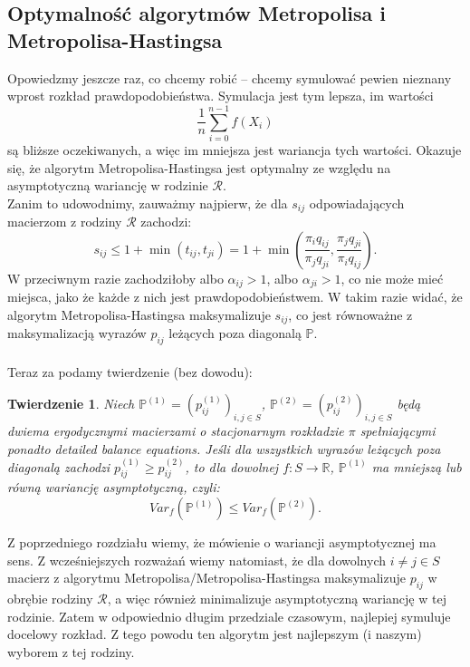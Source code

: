 \documentclass[a4paper]{article}
\theoremstyle{defn}
\theoremstyle{theorem}
\newtheorem{theorem}[defn]{Twierdzenie}
\theoremstyle{lemma}
\theoremstyle{cor}
\theoremstyle{fact}
\begin{document}
\subsection{Optymalność algorytmów Metropolisa i Metropolisa-Hastingsa}
Opowiedzmy jeszcze raz, co chcemy robić – chcemy symulować pewien nieznany wprost rozkład prawdopodobieństwa. Symulacja jest tym lepsza, im wartości $$\frac{1}{n}\sum\limits_{i = 0}^{n-1} f(X_i)$$
są bliższe oczekiwanych, a więc im mniejsza jest wariancja tych wartości. Okazuje się, że algorytm Metropolisa-Hastingsa jest optymalny ze względu na asymptotyczną wariancję w rodzinie $\mathcal{R}$.\\

Zanim to udowodnimy, zauważmy najpierw, że dla $s_{ij}$ odpowiadających macierzom z rodziny $\mathcal{R}$ zachodzi:
$$s_{ij} \leq 1 + \min(t_{ij}, t_{ji}) = 1 + \min\left(\frac{\pi_i q_{ij}}{\pi_j q_{ji}}, \frac{\pi_j q_{ji}}{\pi_i q_{ij}}\right).$$
W przeciwnym razie zachodziłoby albo $\alpha_{ij} > 1$, albo $\alpha_{ji} > 1$, co nie może mieć miejsca, jako że każde z nich jest prawdopodobieństwem. W takim razie widać, że algorytm Metropolisa-Hastingsa maksymalizuje $s_{ij}$, co jest równoważne z maksymalizacją wyrazów $p_{ij}$ leżących poza diagonalą $\mathbb{P}$.\\\\
Teraz za \cite{peskun} podamy twierdzenie (bez dowodu): \\
\begin{theorem}
Niech $\mathbb{P}^{(1)} = (p_{ij}^{(1)})_{i,j \in S}$, $\mathbb{P}^{(2)}= (p_{ij}^{(2)})_{i,j \in S}$ będą dwiema ergodycznymi macierzami o stacjonarnym rozkładzie $\pi$ spełniającymi ponadto \textit{detailed balance equations}. Jeśli dla wszystkich wyrazów leżących poza diagonalą zachodzi $p_{ij}^{(1)} \geq p_{ij}^{(2)}$, to dla dowolnej $f: S \to \mathbb{R}$,  $\mathbb{P}^{(1)}$ ma mniejszą lub równą wariancję asymptotyczną, czyli:
$$Var_f(\mathbb{P}^{(1)}) \leq Var_f(\mathbb{P}^{(2)}).$$
\end{theorem}
Z poprzedniego rozdziału wiemy, że mówienie o wariancji asymptotycznej ma sens. Z wcześniejszych rozważań wiemy natomiast, że dla dowolnych $i \neq j \in S$ macierz z algorytmu Metropolisa/Metropolisa-Hastingsa maksymalizuje $p_{ij}$ w obrębie rodziny $\mathcal{R}$, a więc również minimalizuje asymptotyczną wariancję w tej rodzinie. Zatem w odpowiednio długim przedziale czasowym, najlepiej symuluje docelowy rozkład. Z tego powodu ten algorytm jest najlepszym (i naszym) wyborem z tej rodziny. \\
\end{document}

